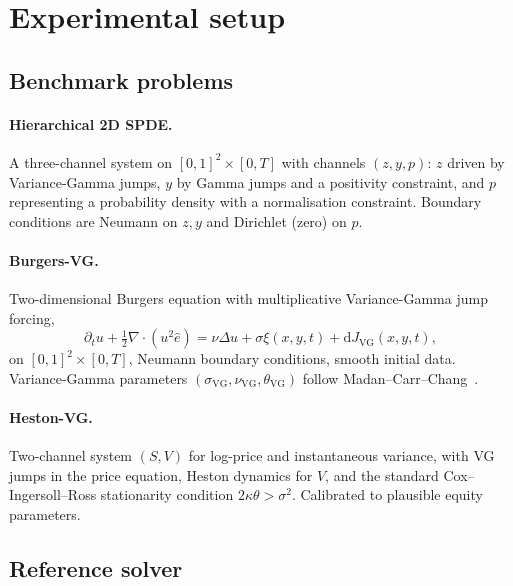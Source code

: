\documentclass[review,12pt]{elsarticle}
\begin{document}
\section{Experimental setup}
\label{sec:setup}

\subsection{Benchmark problems}
\label{subsec:problems}

\paragraph{Hierarchical 2D SPDE.}
A three-channel system on \([0,1]^2 \times [0, T]\) with channels
\((z, y, p)\): \(z\) driven by Variance-Gamma jumps, \(y\) by
Gamma jumps and a positivity constraint, and \(p\) representing a
probability density with a normalisation constraint. Boundary
conditions are Neumann on \(z, y\) and Dirichlet (zero) on \(p\).

\paragraph{Burgers-VG.}
Two-dimensional Burgers equation with multiplicative
Variance-Gamma jump forcing,
\begin{equation}
\partial_t u + \tfrac12 \nabla \cdot (u^2 \hat e)
= \nu \Delta u + \sigma \xi(x, y, t)
+ \mathrm dJ_{\mathrm{VG}}(x, y, t),
\label{eq:burgersvg}
\end{equation}
on \([0,1]^2 \times [0, T]\), Neumann boundary conditions, smooth
initial data. Variance-Gamma parameters
\((\sigma_{\mathrm{VG}}, \nu_{\mathrm{VG}}, \theta_{\mathrm{VG}})\)
follow Madan--Carr--Chang~\cite{MadanCarrChang1998}.

\paragraph{Heston-VG.}
Two-channel system \((S, V)\) for log-price and instantaneous
variance, with VG jumps in the price equation, Heston dynamics for
\(V\), and the standard Cox--Ingersoll--Ross stationarity
condition \(2\kappa\theta > \sigma^2\). Calibrated to plausible
equity parameters.

\subsection{Reference solver}
\end{document}
